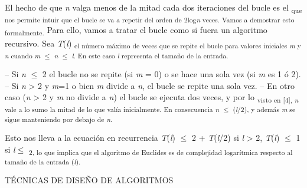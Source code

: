 \documentclass[12pt]{article}
\renewcommand{\_}{\kern-1.5pt\textunderscore\kern-1.5pt}
\begin{document}
\begin{adjustwidth}{0.58in}{0.57in}
{\fontsize{10pt}{12.0pt}\selectfont El hecho de que \textit{n }valga menos de la mitad cada dos iteraciones del bucle es el \textsubscript{que nos permite intuir que el bucle se va a repetir del orden de 2log\textit{n }veces. Vamos a demostrar esto formalmente. }Para ello, vamos a tratar el bucle como si fuera un algoritmo recursivo. Sea \textit{T}(\textit{l}) \textsubscript{el número máximo de veces que se repite el bucle para valores iniciales \textit{m }y \textit{n }cuando \textit{m }$ \leq $  \textit{n }$ \leq $  \textit{l}. En este caso \textit{l }representa el tamaño de la entrada. }\par}\par

\end{adjustwidth}

\begin{adjustwidth}{0.57in}{0.57in}
{\fontsize{10pt}{12.0pt}\selectfont – Si \textit{n }$ \leq $  2 el bucle no se repite (si \textit{m }= 0) o se hace una sola vez (si \textit{m }es 1 ó 2). – Si \textit{n }> 2 y \textit{m}=1 o bien \textit{m }divide a \textit{n}, el bucle se repite una sola vez. – En otro caso (\textit{n }> 2 y \textit{m }no divide a \textit{n}) el bucle se ejecuta dos veces, y por lo \textsubscript{visto en [4], \textit{n }vale a lo sumo la mitad de lo que valía inicialmente. En consecuencia \textit{n }$ \leq $  (\textit{l}/2), y además \textit{m }se sigue manteniendo por debajo de \textit{n}. }\par}\par

\end{adjustwidth}

\begin{adjustwidth}{0.57in}{0.57in}
{\fontsize{10pt}{12.0pt}\selectfont Esto nos lleva a la ecuación en recurrencia \textit{T}(\textit{l}) $ \leq $  2 + \textit{T}(\textit{l}/2) si \textit{l }> 2, \textit{T}(\textit{l}) $ \leq $  1 si \textit{l}$ \leq $  \textsubscript{2, lo que implica que el algoritmo de Euclides es de complejidad logarítmica respecto al tamaño de la entrada (\textit{l}). }\par}\par

\end{adjustwidth}

\begin{adjustwidth}{0.58in}{0.57in}
{\fontsize{10pt}{12.0pt} {\fontsize{7pt}{8.4pt}\selectfont TÉCNICAS DE DISEÑO DE ALGORITMOS \par}\par}\par

\end{adjustwidth}
\end{document}
